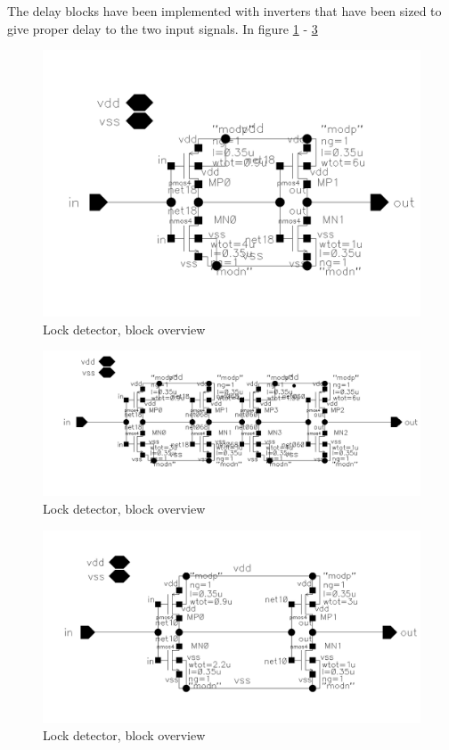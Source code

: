 \documentclass[a4paper,12pt]{article} \usepackage{graphicx}
\begin{document}
The delay blocks have been implemented with inverters that have been
sized to give proper delay to the two input signals. In figure
\ref{fig:s_delay} - \ref{fig:c_delay}

\begin{figure}[h]
        \centering
        \includegraphics[width=150mm]{../Bilder/LD_tran/single_delay.png}
        \caption{Lock detector, block overview}
        \label{fig:s_delay}
\end{figure}

\begin{figure}[h]
        \centering
        \includegraphics[width=150mm]{../Bilder/LD_tran/double_delay.png}
        \caption{Lock detector, block overview}
        \label{fig:d_delay}
\end{figure}

\begin{figure}[h]
        \centering
        \includegraphics[width=150mm]{../Bilder/LD_tran/compensation_delay.png}
        \caption{Lock detector, block overview}
        \label{fig:c_delay}
\end{figure}
\end{document}
